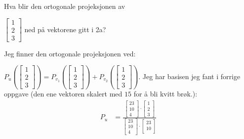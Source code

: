 \documentclass[11pt, a4paper, norsk]{NTNUoving}
\begin{document}
   \begin{oppgave}
       Hva blir den ortogonale projeksjonen av
       \begin{punkt}
           $\begin{bmatrix}
               1 \\
               2 \\
               3
           \end{bmatrix}$ ned på vektorene gitt i 2a?

           Jeg finner den ortogonale projeksjonen ved:

           $P_{u}\left(\begin{bmatrix}
               1 \\
               2 \\
               3
       \end{bmatrix}\right) = P_{v_1}\left(\begin{bmatrix}
           1 \\
           2 \\
           3
       \end{bmatrix}\right) + P_{v_2}\left(\begin{bmatrix}
           1 \\
           2 \\
           3
   \end{bmatrix}\right)$. Jeg har basisen jeg fant i forrige oppgave (den ene vektoren skalert med $15$ for å bli kvitt brøk.):
           \begin{align*}
               P_{u} &= \frac{\begin{bmatrix}
                   23 \\
                   10 \\
                   4
               \end{bmatrix} \cdot \begin{bmatrix}
                   1 \\
                   2 \\ 
                   3
               \end{bmatrix}}{\begin{bmatrix}
                   23 \\
                   10 \\
                   4
               \end{bmatrix} \cdot \begin{bmatrix}
                   23 \\
                   10 \\

\end{bmatrix}}
\end{align*}
\end{punkt}
\end{oppgave}
\end{document}
